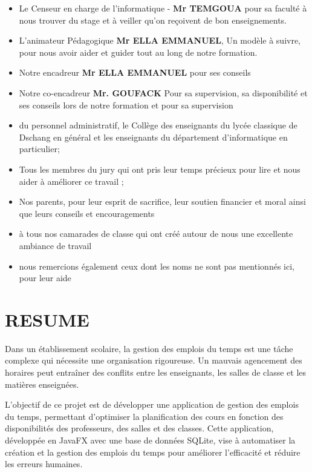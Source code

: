 \documentclass[english,12pt,a4paper]{report}
\begin{document}
\begin{spacing}{1.5}
\begin{itemize}[label=\textbullet, font=\LARGE %
	]
	\item Le Censeur en charge de l'informatique - \textbf{Mr TEMGOUA} pour sa faculté à nous trouver du stage et à veiller qu'on reçoivent de bon enseignements.
	
	\item L'animateur Pédagogique \textbf{Mr ELLA EMMANUEL}, Un modèle à suivre, pour nous avoir aider et guider tout au long de notre formation.
	
	\item Notre encadreur  \textbf{	Mr ELLA EMMANUEL }  pour ses conseils   
	
	\item Notre co-encadreur \textbf{Mr. GOUFACK } Pour sa supervision, sa disponibilité et ses conseils lors de notre formation  et pour sa supervision 
	
	
	\item du personnel administratif, le Collège des enseignants du lycée classique de Dschang en général et les enseignants du département d'informatique en particulier;
	
	\item Tous les membres du jury qui ont pris leur temps précieux pour lire et nous aider à améliorer ce travail ; 
	
	\item 	 Nos parents, pour leur esprit de sacrifice, leur soutien financier et moral ainsi que leurs conseils et encouragements
	\item 	 à tous nos camarades de classe qui ont créé autour de nous une excellente ambiance de travail
	\item 	 nous remercions également ceux dont les noms ne sont pas mentionnés ici, pour leur aide
\end{itemize}	

\chapter*{RESUME}
\hspace{1.2cm}
Dans un établissement scolaire, la gestion des emplois du temps est une tâche complexe qui nécessite une organisation rigoureuse. Un mauvais agencement des horaires peut entraîner des conflits entre les enseignants, les salles de classe et les matières enseignées.

L’objectif de ce projet est de développer une application de gestion des emplois du temps, permettant d’optimiser la planification des cours en fonction des disponibilités des professeurs, des salles et des classes. Cette application, développée en JavaFX avec une base de données SQLite, vise à automatiser la création et la gestion des emplois du temps pour améliorer l’efficacité et réduire les erreurs humaines.


\end{spacing}
\end{document}
